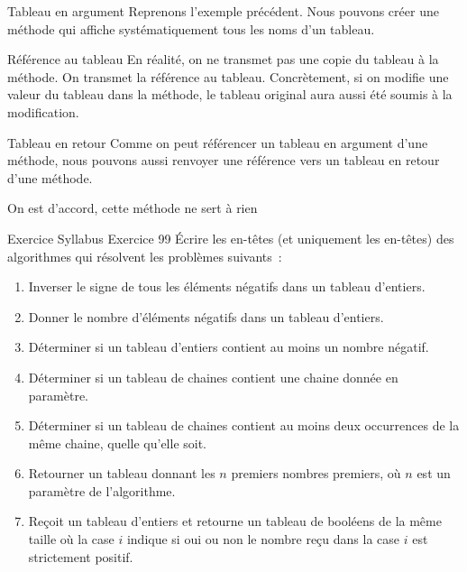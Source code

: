 \begin{frame}{Tableau en argument}
    \pause
    Reprenons l'exemple précédent. Nous pouvons créer une méthode qui affiche systématiquement tous les noms d'un tableau.
    

    \pause
    \begin{alertblock}{Référence au tableau}
        En réalité, on ne transmet pas une copie du tableau à la méthode. On transmet la référence au tableau.
        Concrètement, si on modifie une valeur du tableau dans la méthode,
        le tableau original aura aussi été soumis à la modification.
    \end{alertblock}
\end{frame}

\begin{frame}{Tableau en retour}
    \pause
    Comme on peut référencer un tableau en argument d'une méthode,
    nous pouvons aussi renvoyer une référence vers un tableau en retour d'une méthode.
    

    \pause
    \center\tiny On est d'accord, cette méthode ne sert à rien
\end{frame}

\begin{frame}[shrink]{Exercice \theexercice}{Syllabus Exercice 99}
    \pause
    Écrire les en-têtes (et uniquement les en-têtes)
    des algorithmes qui résolvent les problèmes suivants~:
    \begin{enumerate}
        \item\pause
        Inverser le signe de tous les éléments négatifs dans un tableau d’entiers.
        \item\pause
        Donner le nombre d’éléments négatifs dans un tableau d’entiers.
        \item\pause
        Déterminer si un tableau d’entiers contient au moins un nombre négatif.
        \item\pause
        Déterminer si un tableau de chaines contient
        une chaine donnée en paramètre.
        \item\pause
        Déterminer si un tableau de chaines contient
        au moins deux occurrences de la même chaine,
        quelle qu’elle soit.
        \item\pause
        Retourner un tableau donnant les $n$ premiers nombres premiers,
        où $n$ est un paramètre de l’algorithme.
        \item\pause
        Reçoit un tableau d’entiers
        et retourne un tableau de booléens de la même taille
        où la case $i$ indique si oui ou non
        le nombre reçu dans la case $i$ est strictement positif.
    \end{enumerate}
\end{frame}

